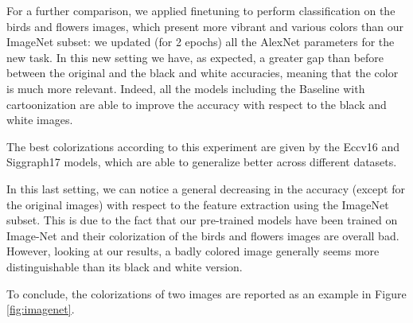 For a further comparison, we applied finetuning to perform classification on the birds and flowers images, which present more vibrant and various colors than our ImageNet subset: we updated (for 2 epochs) all the AlexNet parameters for the new task. In this new setting we have, as expected, a greater gap than before between the original and the black and white accuracies, meaning that the color is much more relevant. Indeed, all the models including the Baseline with cartoonization are able to improve the accuracy with respect to the black and white images.

The best colorizations according to this experiment are given by the Eccv16 and Siggraph17 models, which are able to generalize better across different datasets.

In this last setting, we can notice a general decreasing in the accuracy (except for the original images) with respect to the feature extraction using the ImageNet subset. This is due to the fact that our pre-trained models have been trained on Image-Net and their colorization of the birds and flowers images are overall bad. However, looking at our results, a badly colored image generally seems more distinguishable than its black and white version.

To conclude, the colorizations of two images are reported as an example in Figure \ref{fig:imagenet}.

